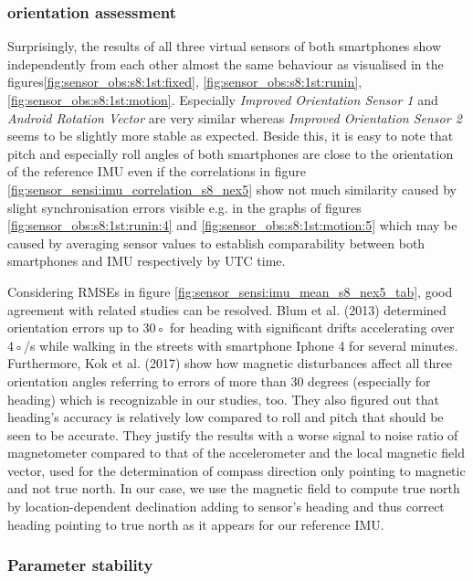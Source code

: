 \documentclass[review]{elsarticle}
\begin{document}
\subsubsection{orientation assessment}
 
Surprisingly, the results of all three virtual sensors of both smartphones show independently from each other almost the same behaviour as visualised in the figures\ref{fig:sensor_obs:s8:1st:fixed}, \ref{fig:sensor_obs:s8:1st:runin}, \ref{fig:sensor_obs:s8:1st:motion}. Especially \textit{Improved Orientation Sensor 1} and \textit{Android Rotation Vector} are very similar whereas \textit{Improved Orientation Sensor 2} seems to be slightly more stable as expected.
Beside this, it is easy to note that pitch and especially roll angles of both smartphones are close to the orientation of the reference \gls{IMU} even if the correlations in figure \ref{fig:sensor_sensi:imu_correlation_s8_nex5} show not much similarity caused by slight synchronisation errors visible e.g. in the graphs of figures \ref{fig:sensor_obs:s8:1st:runin:4} and \ref{fig:sensor_obs:s8:1st:motion:5} which may be caused by averaging sensor values to establish comparability between both smartphones and \gls{IMU} respectively by UTC time. 

Considering \glspl{RMSE} in figure \ref{fig:sensor_sensi:imu_mean_s8_nex5_tab}, good agreement with related studies can be resolved. Blum et al. (2013) \cite{Blum2013} determined orientation errors up to 30◦ for heading with significant drifts accelerating over 4◦/s while walking in the streets with smartphone Iphone 4 for several minutes. Furthermore, Kok et al. (2017) \cite{Kok2017} show how magnetic disturbances affect all three orientation angles referring to errors of more than 30 degrees (especially for heading) which is  recognizable in our studies, too. They also figured out that heading's accuracy is relatively low compared to roll and pitch that should be seen to be accurate. They justify the results with a worse signal to noise ratio of magnetometer compared to that of the accelerometer and the local magnetic field vector, used for the determination of compass direction only pointing to magnetic and not true north. In our case, we use the magnetic field to compute true north by location-dependent declination adding to sensor's heading and thus correct heading pointing to true north as it appears for our reference \gls{IMU}. 






\subsubsection{Parameter stability}
\label{sec:technology:sensors:stability}
\end{document}
